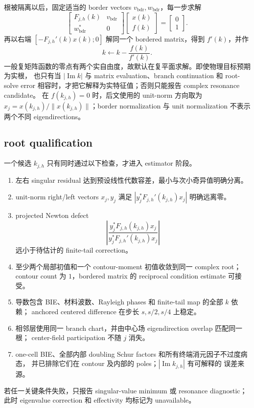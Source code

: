 \documentclass[UTF8,fontset=fandol,11pt,a4paper]{ctexart}
\begin{document}
根被隔离以后，固定适当的 border vectors $v_{\mathrm{bdr}},w_{\mathrm{bdr}}$，每一步求解
\[
  \begin{bmatrix}
    F_{j,h}(k)&v_{\mathrm{bdr}}\\
    w_{\mathrm{bdr}}^*&0
  \end{bmatrix}
  \begin{bmatrix}x(k)\\f(k)\end{bmatrix}
  =
  \begin{bmatrix}0\\1\end{bmatrix}.
\]
再以右端 $[-F_{j,h}'(k)x(k);0]$ 解同一个 bordered matrix，得到 $f'(k)$，并作
\[
  k\leftarrow k-\frac{f(k)}{f'(k)}.
\]
一般复矩阵函数的零点有两个实自由度，故默认在复平面求解。即使物理目标预期为实根，
也只有当 $|\operatorname{Im}k|$ 与 matrix evaluation、branch continuation 和
root-solve error 相容时，才把它解释为实特征值；否则只能报告 complex resonance
candidate。
在 $f(k_{j,h})=0$ 时，后文使用的 unit-norm 方向取为
$x_j=x(k_{j,h})/\|x(k_{j,h})\|$；border normalization 与 unit normalization 不表示
两个不同 eigendirections。

\subsection{root qualification}

一个候选 $k_{j,h}$ 只有同时通过以下检查，才进入 estimator 阶段。
\begin{enumerate}
  \item 左右 singular residual 达到预设线性代数容差，最小与次小奇异值明确分离。
  \item unit-norm right/left vectors $x_j,y_j$ 满足
  $|y_j^*F_{j,h}'(k_{j,h})x_j|$ 明确远离零。
  \item projected Newton defect
  \[
    \left|
    \frac{y_j^*F_{j,h}(k_{j,h})x_j}
         {y_j^*F_{j,h}'(k_{j,h})x_j}
    \right|
  \]
  远小于待估计的 finite-tail correction。
  \item 至少两个局部初值和一个 contour-moment 初值收敛到同一 complex root；
  contour count 为 $1$，bordered matrix 的 reciprocal condition estimate 可接受。
  \item 导数包含 BIE、材料波数、Rayleigh phases 和 finite-tail map 的全部 $k$ 依赖；
  anchored centered difference 在步长 $s,s/2,s/4$ 上稳定。
  \item 相邻层使用同一 branch chart，并由中心场 eigendirection overlap 匹配同一根；
  center-field participation 不随 $j$ 消失。
  \item one-cell BIE、全部内部 doubling Schur factors 和所有终端消元因子不过度病态，
  并已排除它们在 contour 及内部的 poles；$|\operatorname{Im}k_{j,h}|$ 有可解释的
  误差来源。
\end{enumerate}
若任一关键条件失败，只报告 singular-value minimum 或 resonance diagnostic；此时
eigenvalue correction 和 effectivity 均标记为 unavailable。
\end{document}
